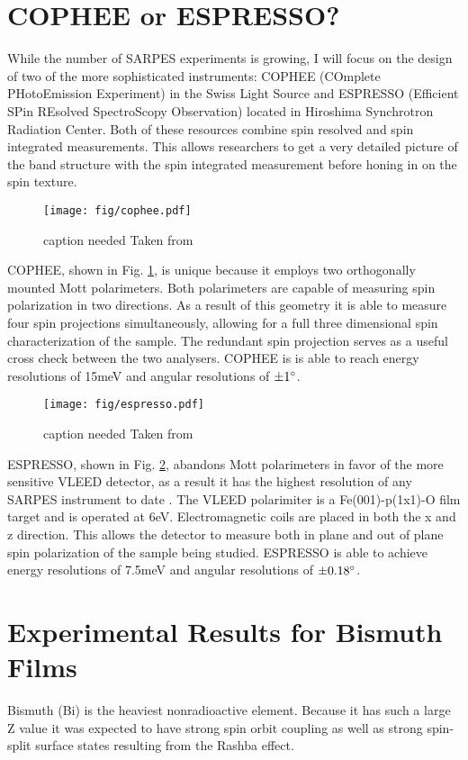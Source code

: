 \documentclass[12pt]{article}
\begin{document}
\section{COPHEE or ESPRESSO?}
While the number of SARPES experiments is growing, I will focus on the design of two of the more sophisticated instruments:  COPHEE (COmplete PHotoEmission Experiment) in the Swiss Light Source and ESPRESSO (Efficient SPin REsolved SpectroScopy Observation) located in Hiroshima Synchrotron Radiation Center.
Both of these resources combine spin resolved and spin integrated measurements.
This allows researchers to get a very detailed picture of the band structure with the spin integrated measurement before honing in on the spin texture.

\begin{figure}[h]
  \centering
  \texttt{[image: fig/cophee.pdf]}
  \caption[should I put this here?]
  {caption needed Taken from \cite{Hoesch}}
  \label{fig:cophee}
\end{figure}
COPHEE, shown in Fig. \ref{fig:cophee}, is unique because it employs two orthogonally mounted Mott polarimeters\cite{Hoesch}.
Both polarimeters are capable of measuring spin polarization in two directions.
As a result of this geometry it is able to measure four spin projections simultaneously, allowing for a full three dimensional spin characterization of the sample.
The redundant spin projection serves as a useful cross check between the two analysers.
COPHEE is is able to reach energy resolutions of 15meV and angular resolutions of $\pm1\degree$.

\begin{figure}[h]
  \centering
  \texttt{[image: fig/espresso.pdf]}
  \caption[should I put this here?]
  {caption needed Taken from \cite{Okuda}}
  \label{fig:espresso}
\end{figure}
ESPRESSO, shown in Fig. \ref{fig:espresso}, abandons Mott polarimeters in favor of the more sensitive VLEED detector, as a result it has the highest resolution of any SARPES instrument to date \cite{Okuda}.
The VLEED polarimiter is a Fe(001)-p(1x1)-O film target and is operated at 6eV.
Electromagnetic coils are placed in both the x and z direction.
This allows the detector to measure both in plane and out of plane spin polarization of the sample being studied.
ESPRESSO is able to achieve energy resolutions of 7.5meV and angular resolutions of $\pm0.18\degree$.

\section{Experimental Results for Bismuth Films}
Bismuth (Bi) is the heaviest nonradioactive element.
Because it has such a large Z value it was expected to have strong spin orbit coupling as well as strong spin-split surface states resulting from the Rashba effect.
\end{document}
